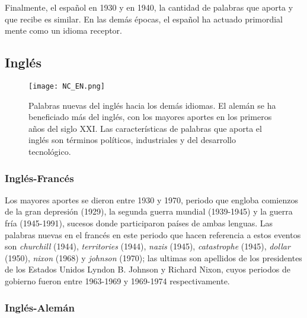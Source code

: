 Finalmente, el español en 1930 y en 1940, la cantidad de palabras que aporta y que recibe es similar.  En las demás épocas, el español ha actuado primordial mente como un idioma receptor. 




\clearpage
\subsection{Inglés} %


\begin{figure} %
	\centering
	\texttt{[image: NC\_EN.png]}
	\caption{Palabras nuevas del inglés hacia los demás idiomas. El alemán se ha beneficiado más del inglés, con los mayores aportes en los primeros años del siglo XXI. Las características de palabras que aporta el inglés son términos políticos, industriales y del desarrollo tecnológico.}
	\label{fig.NC_EN}
\end{figure} %


\subsubsection*{Inglés-Francés} %

Los mayores aportes se dieron entre 1930 y 1970, periodo que engloba comienzos de
la gran depresión (1929), la segunda guerra mundial (1939-1945) y la guerra fría (1945-1991), sucesos donde participaron países de ambas lenguas. Las palabras nuevas en el francés en este periodo que hacen referencia a estos eventos son \textit{churchill} (1944), \textit{territories} (1944), \textit{nazis} (1945), \textit{catastrophe} (1945), \textit{dollar} (1950), \textit{nixon} (1968) y \textit{johnson} (1970); las ultimas son apellidos de los presidentes de los Estados Unidos  Lyndon B. Johnson y Richard Nixon, cuyos periodos de gobierno fueron  entre 1963-1969 y 1969-1974 respectivamente.

\subsubsection*{Inglés-Alemán} %

